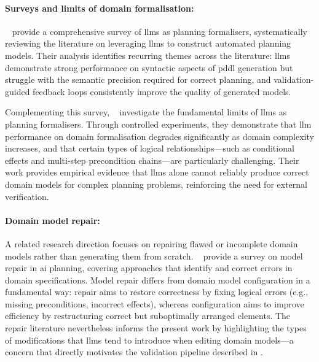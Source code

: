 \paragraph{Surveys and limits of domain formalisation:}
\citeauthor{Tantakoun2025}~\cite{Tantakoun2025} provide a comprehensive survey of \glspl{llm} as planning formalisers, systematically reviewing the literature on leveraging \glspl{llm} to construct automated planning models.
Their analysis identifies recurring themes across the literature: \glspl{llm} demonstrate strong performance on syntactic aspects of \gls{pddl} generation but struggle with the semantic precision required for correct planning, and validation-guided feedback loops consistently improve the quality of generated models.

Complementing this survey, \citeauthor{Huang2025}~\cite{Huang2025} investigate the fundamental limits of \glspl{llm} as planning formalisers.
Through controlled experiments, they demonstrate that \gls{llm} performance on domain formalisation degrades significantly as domain complexity increases, and that certain types of logical relationships---such as conditional effects and multi-step precondition chains---are particularly challenging.
Their work provides empirical evidence that \glspl{llm} alone cannot reliably produce correct domain models for complex planning problems, reinforcing the need for external verification.

\paragraph{Domain model repair:}
A related research direction focuses on repairing flawed or incomplete domain models rather than generating them from scratch.
\citeauthor{Bercher2025}~\cite{Bercher2025} provide a survey on model repair in \gls{ai} planning, covering approaches that identify and correct errors in domain specifications.
Model repair differs from domain model configuration in a fundamental way: repair aims to restore correctness by fixing logical errors (e.g., missing preconditions, incorrect effects), whereas configuration aims to improve efficiency by restructuring correct but suboptimally arranged elements.
The repair literature nevertheless informs the present work by highlighting the types of modifications that \glspl{llm} tend to introduce when editing domain models---a concern that directly motivates the validation pipeline described in .

